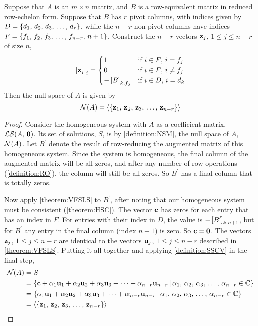 \documentclass{ximera}
\begin{document}
\begin{theorem}
  \label{theorem:SSNS}Suppose that $A$ is an $m\times n$ matrix, and $B$ is a row-equivalent
  matrix in reduced row-echelon form.  Suppose that $B$ has $r$ pivot
  columns, with indices given by
  $D=\left\{d_1,\,d_2,\,d_3,\,\ldots,\,d_r\right\}$, while the $n-r$ non-pivot
  columns have indices
  $F=\left\{f_1,\,f_2,\,f_3,\,\ldots,\,f_{n-r},\,n+1\right\}$.  Construct the
  $n-r$ vectors $\mathbf{z}_j$, $1\leq j\leq n-r$ of size $n$,
  \[
    \left\lbrack\mathbf{z}_j\right\rbrack_{i}=
    \begin{cases}
      1&\text{if $i\in F$, $i=f_j$}\\
      0&\text{if $i\in F$, $i\neq f_j$}\\
      -\left\lbrack B\right\rbrack_{k,f_j}&\text{if $i\in D$, $i=d_k$}
    \end{cases}
  \]
  Then the null space of $A$ is given by
  \[
    \mathcal{N}\!\left(A\right)=\left\langle\left\{\mathbf{z}_{1},\,\mathbf{z}_{2},\,\mathbf{z}_{3},\,\ldots,\,\mathbf{z}_{n-r}\right\}\right\rangle
  \]

  \begin{proof}
    Consider the homogeneous system with $A$ as a coefficient matrix,
    $\mathcal{LS}\!\left(A,\,\mathbf{0}\right)$.  Its set of solutions, $S$, is by
    \ref{definition:NSM}, the null space of $A$, $\mathcal{N}\!\left(A\right)$.  Let
    $B^{\prime}$ denote the result of row-reducing the augmented
    matrix of this homogeneous system.  Since the system is
    homogeneous, the final column of the augmented matrix will be all
    zeros, and after any number of row operations
    (\ref{definition:RO}), the column will still be all zeros.  So
    $B^{\prime}$ has a final column that is totally zeros.

    Now apply \ref{theorem:VFSLS} to $B^{\prime}$, after noting that
    our homogeneous system must be consistent (\ref{theorem:HSC}).
    The vector $\mathbf{c}$ has zeros for each entry that has an index
    in $F$.  For entries with their index in $D$, the value is
    $-\left\lbrack B^{\prime}\right\rbrack_{k,{n+1}}$, but for $B^{\prime}$ any
    entry in the final column (index $n+1$) is zero.  So
    $\mathbf{c}=\mathbf{0}$.  The vectors $\mathbf{z}_j$,
    $1\leq j\leq n-r$ are identical to the vectors $\mathbf{u}_j$,
    $1\leq j\leq n-r$ described in \ref{theorem:VFSLS}.  Putting it
    all together and applying \ref{definition:SSCV} in the final step,
    \begin{align*}
      \mathcal{N}\!\left(A\right)
      &=S\\
      &=\left\lbrace
        \mathbf{c}+\alpha_1\mathbf{u}_1+\alpha_2\mathbf{u}_2+\alpha_3\mathbf{u}_3+\cdots+\alpha_{n-r}\mathbf{u}_{n-r}
        \,\middle|\,
        \alpha_1,\,\alpha_2,\,\alpha_3,\,\ldots,\,\alpha_{n-r}\in\mathbb{C}
        \right\rbrace\\
      &=\left\lbrace
        \alpha_1\mathbf{u}_1+\alpha_2\mathbf{u}_2+\alpha_3\mathbf{u}_3+\cdots+\alpha_{n-r}\mathbf{u}_{n-r}
        \,\middle|\,
\alpha_1,\,\alpha_2,\,\alpha_3,\,\ldots,\,\alpha_{n-r}\in\mathbb{C}
        \right\rbrace\\
      &=\left\langle\left\{\mathbf{z}_{1},\,\mathbf{z}_{2},\,\mathbf{z}_{3},\,\ldots,\,\mathbf{z}_{n-r}\right\}\right\rangle
    \end{align*}
  \end{proof}
\end{theorem}
\end{document}
